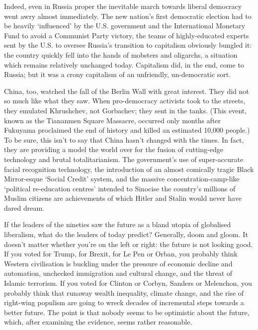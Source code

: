    Indeed, even in Russia proper the inevitable march towards liberal
   democracy went awry almost immediately. The new nation's first
   democratic election had to be heavily `influenced' by the U.S.
   government and the International Monetary Fund to avoid a Communist
   Party victory, the teams of highly-educated experts sent by the U.S. to
   oversee Russia's transition to capitalism obviously bungled it: the
   country quickly fell into the hands of mobsters and oligarchs, a
   situation which remains relatively unchanged today. Capitalism did, in
   the end, come to Russia; but it was a crony capitalism of an
   unfriendly, un-democratic sort.

   China, too, watched the fall of the Berlin Wall with great interest.
   They did not so much like what they saw. When pro-democracy activists
   took to the streets, they emulated Khrushchev, not Gorbachev; they sent
   in the tanks. (This event, known as the Tiananmen Square Massacre,
   occurred only months after Fukuyama proclaimed the end of history and
   killed an estimated 10,000 people.) To be sure, this isn't to say that
   China hasn't changed with the times. In fact, they are providing a
   model the world over for the fusion of cutting-edge technology and
   brutal totalitarianism. The government's use of super-accurate facial
   recognition technology, the introduction of an almost comically tragic
   Black Mirror-esque `Social Credit' system, and the massive
   concentration-camp-like `political re-education centres' intended to
   Sinocise the country's millions of Muslim citizens are achievements of
   which Hitler and Stalin would never have dared dream.

   If the leaders of the nineties saw the future as a bland utopia of
   globalised liberalism, what do the leaders of today predict? Generally,
   doom and gloom. It doesn't matter whether you're on the left or right:
   the future is not looking good. If you voted for Trump, for Brexit, for
   Le Pen or Orban, you probably think Western civilisation is buckling
   under the pressure of economic decline and automation, unchecked
   immigration and cultural change, and the threat of Islamic terrorism.
   If you voted for Clinton or Corbyn, Sanders or Melenchon, you probably
   think that runaway wealth inequality, climate change, and the rise of
   right-wing populism are going to wreck decades of incremental steps
   towards a better future. The point is that nobody seems to be
   optimistic about the future, which, after examining the evidence, seems
   rather reasonable.

